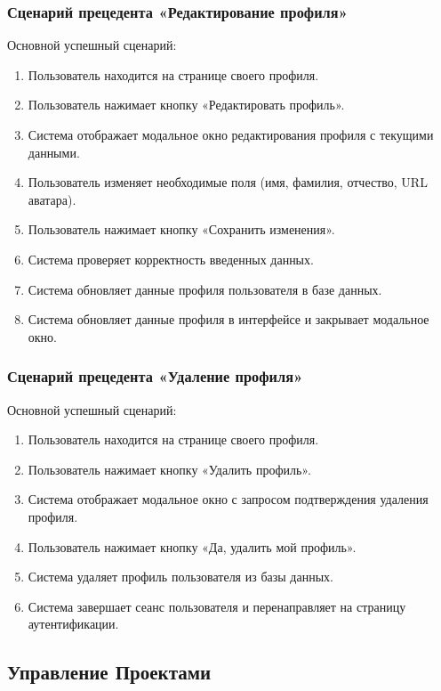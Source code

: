 \subsubsection{Сценарий прецедента «Редактирование профиля»}
Основной успешный сценарий:
\begin{enumerate}
	\item Пользователь находится на странице своего профиля.
	\item Пользователь нажимает кнопку «Редактировать профиль».
	\item Система отображает модальное окно редактирования профиля с текущими данными.
	\item Пользователь изменяет необходимые поля (имя, фамилия, отчество, URL аватара).
	\item Пользователь нажимает кнопку «Сохранить изменения».
	\item Система проверяет корректность введенных данных.
	\item Система обновляет данные профиля пользователя в базе данных.
	\item Система обновляет данные профиля в интерфейсе и закрывает модальное окно.
\end{enumerate}

\subsubsection{Сценарий прецедента «Удаление профиля»}
Основной успешный сценарий:
\begin{enumerate}
	\item Пользователь находится на странице своего профиля.
	\item Пользователь нажимает кнопку «Удалить профиль».
	\item Система отображает модальное окно с запросом подтверждения удаления профиля.
	\item Пользователь нажимает кнопку «Да, удалить мой профиль».
	\item Система удаляет профиль пользователя из базы данных.
	\item Система завершает сеанс пользователя и перенаправляет на страницу аутентификации.
\end{enumerate}

\subsection*{Управление Проектами}

